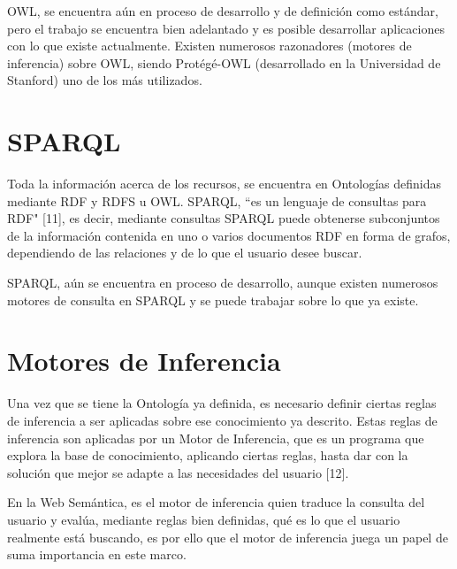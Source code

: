 OWL, se encuentra aún en proceso de desarrollo y de definición como estándar, pero el trabajo se encuentra bien adelantado y es posible desarrollar aplicaciones con lo que existe actualmente. Existen numerosos razonadores (motores de inferencia) sobre OWL, siendo Protégé-OWL (desarrollado en la Universidad de Stanford) uno de los más utilizados.

\section{SPARQL}

Toda la información acerca de los recursos, se encuentra en Ontologías definidas mediante RDF y RDFS u OWL. SPARQL, ``es un lenguaje de consultas para RDF" [11], es decir, mediante consultas SPARQL puede obtenerse subconjuntos de la información contenida en uno o varios documentos RDF en forma de grafos, dependiendo de las relaciones y de lo que el usuario desee buscar.

SPARQL, aún se encuentra en proceso de desarrollo, aunque existen numerosos motores de consulta en SPARQL y se puede trabajar sobre lo que ya existe.

\section{Motores de Inferencia}

Una vez que se tiene la Ontología ya definida, es necesario definir ciertas reglas de inferencia a ser aplicadas sobre ese conocimiento ya descrito. Estas reglas de inferencia son aplicadas por un Motor de Inferencia, que es un programa que explora la base de conocimiento, aplicando ciertas reglas, hasta dar con la solución que mejor se adapte a las necesidades del usuario [12].

En la Web Semántica, es el motor de inferencia quien traduce la consulta del usuario y evalúa, mediante reglas bien definidas, qué es lo que el usuario realmente está buscando, es por ello que el motor de inferencia juega un papel de suma importancia en este marco.

\newpage


